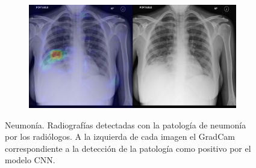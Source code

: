 \begin{figure}[b]
\begin{subfigure}{0.4\textwidth}
    \end{subfigure}
    \begin{subfigure}{0.4\textwidth}
        \centering
        \includegraphics[width=1.0\textwidth]{Chapters/5. Conclusiones/img/Pneumonia/1_1_1d9ec3ad-0120-428b-9778-3805f9348092.png}
    \end{subfigure}

    \caption{Neumonía. Radiografías detectadas con la patología de neumonía por los
                    radiólogos. A la izquierda de cada imagen el GradCam correspondiente a la detección
                    de la patología como positivo por el modelo CNN.}
\end{figure}

